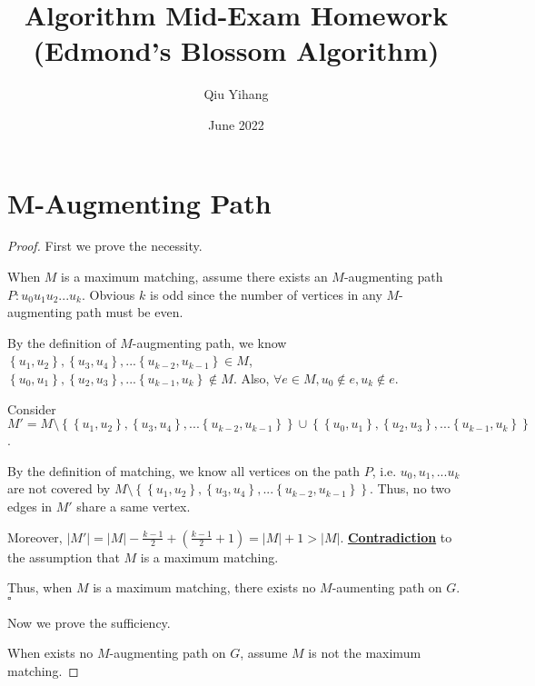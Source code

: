 \documentclass{article}
\title{\textbf{Algorithm Mid-Exam Homework\\ (Edmond's Blossom Algorithm)}}
\author{Qiu Yihang}
\date{June 2022}
\newcommand{\whiteqed}{\hfill $\square$\par}
\newcommand{\set}[1]{\left\{#1\right\}}
\newcommand{\bd}[1]{\boldsymbol{#1}}
\begin{document}
\maketitle

\vspace{1em}
\section{$\bd{M}$-Augmenting Path}
\vspace{1em}
\begin{proof}
    First we prove the necessity.
    
    \hspace{1.3em}
    When $M$ is a maximum matching, assume there exists an $M$-augmenting path $P: u_0u_1u_2...u_k$. Obvious $k$ is odd since the number of vertices in any $M$-augmenting path must be even. 
    
    \hspace{1.3em}
    By the definition of $M$-augmenting path, we know $\set{u_1,u_2},\set{u_3,u_4},...\set{u_{k-2},u_{k-1}}\in M$, $\set{u_0,u_1},\set{u_2,u_3},...\set{u_{k-1},u_{k}}\notin M$. Also, $\forall e\in M, u_0\notin e, u_k\notin e$.
    
    \hspace{1.3em}
    Consider $M'=M\setminus\set{\set{u_1,u_2},\set{u_3,u_4},...\set{u_{k-2},u_{k-1}}}\cup\set{\set{u_0,u_1},\set{u_2,u_3},...\set{u_{k-1},u_{k}}}$. 
    
    \hspace{1.3em}
    By the definition of matching, we know all vertices on the path $P$, i.e. $u_0,u_1,...u_k$ are not covered by $M\setminus\set{\set{u_1,u_2},\set{u_3,u_4},...\set{u_{k-2},u_{k-1}}}$. Thus, no two edges in $M'$ share a same vertex.
    
    \hspace{1.3em}
    Moreover, $|M'|=|M|-\frac{k-1}{2}+\left(\frac{k-1}{2}+1\right)=|M|+1>|M|.$ \underline{\textbf{Contradiction}} to the assumption that $M$ is a maximum matching. 
    
    \hspace{1.3em}
    Thus, when $M$ is a maximum matching, there exists no $M$-aumenting path on $G$. \whiteqed
    
    \vspace{1em} \hspace{1.3em}
    Now we prove the sufficiency.
    
    \hspace{1.3em}
    When exists no $M$-augmenting path on $G$, assume $M$ is not the maximum matching. 
    

\end{proof}
\end{document}
